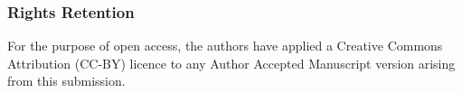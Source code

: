 \documentclass[a4paper,12pt,reqno]{amsart}
\begin{document}
\subsubsection*{Rights Retention}
For the purpose of open access, the authors have applied a Creative Commons Attribution (CC-BY) licence to any Author Accepted Manuscript version arising from this submission.

\printbibliography
\end{document}
